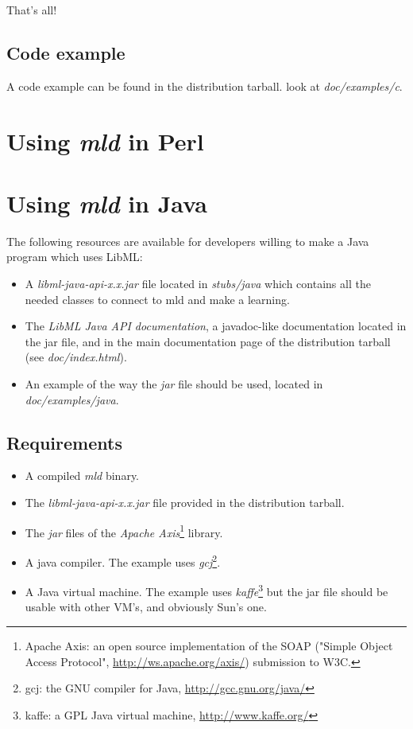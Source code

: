 That's all!

\subsection{Code example}
A code example can be found in the distribution tarball. look at
\textit{doc/examples/c}.

\newpage
\section{Using \textit{mld} in Perl}

\newpage
\section{Using \textit{mld} in Java}

The following resources are available for developers willing to make a Java
program which uses LibML:
\begin{itemize}
\item A \textit{libml-java-api-x.x.jar} file located in \textit{stubs/java} which contains all
the needed classes to connect to mld and make a learning.
\item The \textit{LibML Java API documentation}, a javadoc-like documentation
located in the jar file, and in the main documentation page of the
distribution tarball (see \textit{doc/index.html}).
\item An example of the way the \textit{jar} file should be used, located in
\textit{doc/examples/java}.
\end{itemize}

\subsection{Requirements}

\begin{itemize}
\item A compiled \textit{mld} binary.
\item The \textit{libml-java-api-x.x.jar} file provided in the distribution
tarball.
\item The \textit{jar} files of the \emph{Apache Axis}\footnote{Apache Axis:
an open source implementation of the SOAP ("Simple Object Access Protocol",
\url{http://ws.apache.org/axis/}) submission to W3C.} library.
\item A java compiler. The example uses \emph{gcj}\footnote{gcj: the GNU
compiler for Java, \url{http://gcc.gnu.org/java/}}.
\item A Java virtual machine. The example uses \emph{kaffe}\footnote{kaffe: a
GPL Java virtual machine, \url{http://www.kaffe.org/}} but the jar file
should be usable with other VM's, and obviously Sun's one.
\end{itemize}

